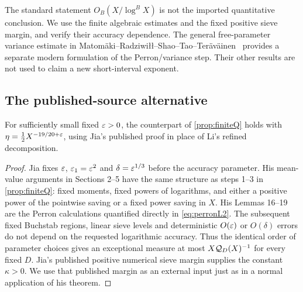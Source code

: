 \begin{remark}
The standard statement $O_B(X/\log^B X)$ is not the imported
quantitative conclusion. We use the finite algebraic estimates and
the fixed positive sieve margin, and verify their accuracy dependence.
The general free-parameter variance estimate in
Matomäki--Radziwiłł--Shao--Tao--Teräväinen~\cite[Lemma 3.3]{MRSTT}
provides a separate modern formulation of the Perron/variance step.
Their other results are not used to claim a new short-interval exponent.
\end{remark}

\subsection{The published-source alternative}

\begin{proposition}\label{prop:jiaQ}
For sufficiently small fixed $\varepsilon>0$, the counterpart of
\cref{prop:finiteQ} holds with
$\eta=\tfrac12X^{-19/20+\varepsilon}$, using Jia's published proof
in place of Li's refined decomposition.
\end{proposition}

\begin{proof}
Jia fixes $\varepsilon$, $\varepsilon_1=\varepsilon^2$ and $\delta=\varepsilon^{1/3}$ before
the accuracy parameter. His mean-value arguments in Sections 2--5
have the same structure as steps 1--3 in \cref{prop:finiteQ}:
fixed moments, fixed powers of logarithms, and either a positive
power of the pointwise saving or a fixed power saving in $X$.
His Lemmas 16--19 are the Perron calculations quantified directly
in \eqref{eq:perronL2}. The subsequent fixed Buchstab regions,
linear sieve levels and deterministic $O(\varepsilon)$ or $O(\delta)$
errors do not depend on the requested logarithmic accuracy.
Thus the identical order of parameter choices gives an exceptional
measure at most $X\mathcal Q_D(X)^{-1}$ for every fixed $D$.
Jia's published positive numerical sieve margin supplies the
constant $\kappa>0$. We use that published margin as an external
input just as in a normal application of his theorem.
\end{proof}


